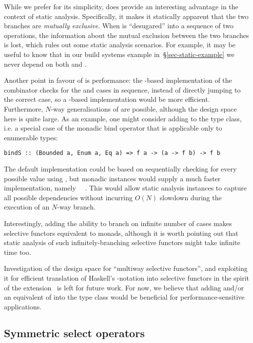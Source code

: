 \noindent
While we prefer  for its simplicity,  does provide an
interesting advantage in the context of static analysis. Specifically, it makes
it statically apparent that the two branches are \emph{mutually exclusive}. When
 is ``desugared'' into a sequence of two  operations, the
information about the mutual exclusion between the two branches is lost, which
rules out some static analysis scenarios. For example, it may be useful to know
that in our build systems example in~\S\ref{sec-static-example} we never depend
on both  and .

Another point in favour of  is performance: the -based
implementation of the  combinator checks for the  and
 cases in sequence, instead of directly jumping to the correct case,
so a -based implementation would be more efficient. Furthermore,
$N$-way generalisations of  are possible, although the design space
here is quite large. As an example, one might consider adding  to the
 type class, i.e. a special case of the monadic bind operator that
is applicable only to enumerable types:

\vspace{1mm}
\begin{verbatim}
bindS :: (Bounded a, Enum a, Eq a) => f a -> (a -> f b) -> f b
\end{verbatim}
\vspace{1mm}

\noindent
The default implementation could be based on sequentially checking for every
possible value using , but monadic instances would supply a much
faster implementation, namely ~\hs{=}~\hs{(>>=)}. This would allow
static analysis instances to capture all possible dependencies without incurring
$O(N)$ slowdown during the execution of an $N$-way branch.

Interestingly, adding the ability to branch on infinite number of cases makes
selective functors equivalent to monads, although it is worth pointing out that
static analysis of such infinitely-branching selective functors might take
infinite time too.

Investigation of the design space for ``multiway selective functors'', and
exploiting it for efficient translation of Haskell's -notation into
selective functors in the spirit of the 
extension~\citep{marlow2016applicativedo} is left for future work. For now, we
believe that adding  and/or an equivalent of  into the
 type class would be beneficial for performance-sensitive
applications.

\subsection{Symmetric select operators}\label{sec-alt-symmetric}



